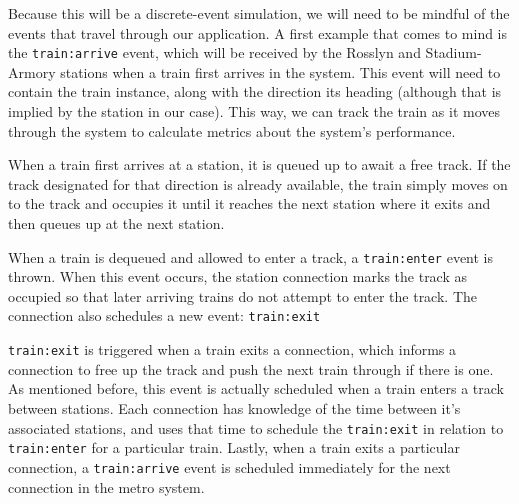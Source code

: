 \documentclass[a4paper,12pt]{article}
\begin{document}
Because this will be a discrete-event simulation, we will need to be mindful of the events that travel through our
application. A first example that comes to mind is the \texttt{train:arrive} event, which will be received by the
Rosslyn and Stadium-Armory stations when a train first arrives in the system. This event will need to contain the train
instance, along with the direction its heading (although that is implied by the station in our case). This way, we can
track the train as it moves through the system to calculate metrics about the system's performance.

When a train first arrives at a station, it is queued up to await a free track. If the track designated for that
direction is already available, the train simply moves on to the track and occupies it until it reaches the next
station where it exits and then queues up at the next station.

When a train is dequeued and allowed to enter a track, a \texttt{train:enter} event is thrown. When this event occurs,
the station connection marks the track as occupied so that later arriving trains do not attempt to enter the track. The
connection also schedules a new event: \texttt{train:exit}

\texttt{train:exit} is triggered when a train exits a connection, which informs a connection to free up the track and
push the next train through if there is one. As mentioned before, this event is actually scheduled when a train enters
a track between stations. Each connection has knowledge of the time between it's associated stations, and uses that
time to schedule the \texttt{train:exit} in relation to \texttt{train:enter} for a particular train. Lastly, when a
train exits a particular connection, a \texttt{train:arrive} event is scheduled immediately for the next connection in
the metro system.
\end{document}
